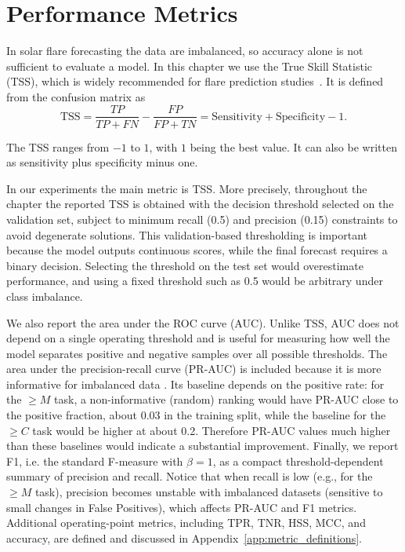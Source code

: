 \section{Performance Metrics}

In solar flare forecasting the data are imbalanced, so accuracy alone is not sufficient to evaluate a model. In this chapter we use the True Skill Statistic (TSS), which is widely recommended for flare prediction studies~\cite{ref_bloomfield}. It is defined from the confusion matrix as
\begin{equation}
\mathrm{TSS} = \frac{TP}{TP + FN} - \frac{FP}{FP + TN} = \text{Sensitivity} + \text{Specificity} -1 .
\end{equation}

The TSS ranges from $-1$ to $1$, with $1$ being the best value. It can also be written as sensitivity plus specificity minus one.

In our experiments the main metric is TSS. More precisely, throughout the chapter the reported TSS is obtained with the decision threshold selected on the validation set, subject to minimum recall (0.5) and precision (0.15) constraints to avoid degenerate solutions. This validation-based thresholding is important because the model outputs continuous scores, while the final forecast requires a binary decision. Selecting the threshold on the test set would overestimate performance, and using a fixed threshold such as 0.5 would be arbitrary under class imbalance.

We also report the area under the ROC curve (AUC). Unlike TSS, AUC does not depend on a single operating threshold and is useful for measuring how well the model separates positive and negative samples over all possible thresholds. The area under the precision-recall curve (PR-AUC) is included because it is more informative for imbalanced data \cite{saito2015precision}. Its baseline depends on the positive rate: for the $\geq M$ task, a non-informative (random) ranking would have PR-AUC close to the positive fraction, about 0.03 in the training split, while the baseline for the $\geq C$ task would be higher at about 0.2. Therefore PR-AUC values much higher than these baselines would indicate a substantial improvement. Finally, we report F1, i.e. the standard F-measure with $\beta=1$, as a compact threshold-dependent summary of precision and recall. Notice that when recall is low (e.g., for the $\geq M$ task), precision becomes unstable with imbalanced datasets (sensitive to small changes in False Positives), which affects PR-AUC and F1 metrics. Additional operating-point metrics, including TPR, TNR, HSS, MCC, and accuracy, are defined and discussed in Appendix~\ref{app:metric_definitions}.

